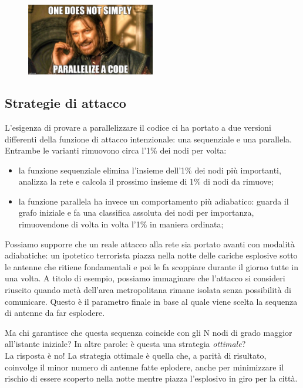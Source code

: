 \begin{figure}[h!]
	\centering
	\includegraphics[width=0.5\textwidth]{./Immagini/Attack/meme_Boromir.jpg}
\end{figure}

\subsection{Strategie di attacco}
\label{subsec:atakstrat}
L'esigenza di provare a parallelizzare il codice ci ha portato a due versioni differenti della funzione di attacco intenzionale: una sequenziale e una parallela. Entrambe le varianti rimuovono circa l'1\% dei nodi per volta: 

\begin{itemize}
 \item la funzione sequenziale elimina l'insieme dell'1\% dei nodi più importanti, analizza la rete e calcola il prossimo insieme di 1\% di nodi da rimuove;
 \item la funzione parallela ha invece un comportamento più adiabatico: guarda il grafo iniziale e fa una classifica assoluta dei nodi per importanza, rimuovendone di volta in volta l'1\% in maniera ordinata;
\end{itemize}



Possiamo supporre che un reale attacco alla rete sia portato avanti con modalità adiabatiche: un ipotetico terrorista piazza nella notte delle cariche esplosive sotto le antenne che ritiene fondamentali e poi le fa scoppiare durante il giorno tutte in una volta. A titolo di esempio, possiamo immaginare che l'attacco si consideri riuscito quando metà dell'area metropolitana rimane isolata senza possibilità di comunicare. Questo è il parametro finale in base al quale viene scelta la sequenza di antenne da far esplodere.

Ma chi garantisce che questa sequenza coincide con gli N nodi di grado maggior all'istante iniziale? In altre parole: è questa una strategia \emph{ottimale}?\\
La risposta è no! La strategia ottimale è quella che, a parità di risultato, coinvolge il minor numero di antenne fatte eplodere, anche per minimizzare il rischio di essere scoperto nella notte mentre piazza l'esplosivo in giro per la città.

